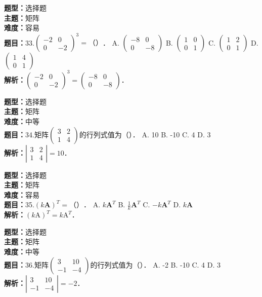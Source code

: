 \documentclass{ctexart}
\newenvironment{question}[5]{%
	\noindent\textbf{题型：}#1\\
	\textbf{主题：}#2\\
	\textbf{难度：}#3\\
	\textbf{题目：}#4\\
	\textbf{解析：}#5\\
	\vspace{1em}
}{}
\begin{document}
	\begin{question}
		{选择题}
		{矩阵}
		{容易}
		{33.\(\left(\begin{array}{cc}-2 & 0 \\ 0 & -2\end{array}\right)^3=（）\)．
			A. \(\left(\begin{array}{cc}-8 & 0 \\ 0 & -8\end{array}\right)\)
			B. \(\left(\begin{array}{ll}1 & 0 \\ 0 & 1\end{array}\right)\)
			C. \(\left(\begin{array}{ll}1 & 2 \\ 0 & 1\end{array}\right)\)
			D. \(\left(\begin{array}{ll}1 & 4 \\ 0 & 1\end{array}\right)\)}
		{\(\left(\begin{array}{cc}-2 & 0 \\ 0 & -2\end{array}\right)^3=\left(\begin{array}{cc}-8 & 0 \\ 0 & -8\end{array}\right)\)．}
	\end{question}
	
	\begin{question}
		{选择题}
		{矩阵}
		{中等}
		{34.矩阵\(\left(\begin{array}{ll}3 & 2 \\ 1 & 4\end{array}\right)\)的行列式值为（）．
			A. 10
			B. -10
			C. 4
			D. 3}
		{\(\left|\begin{array}{ll}3 & 2 \\ 1 & 4\end{array}\right|=10\)．}
	\end{question}
	
	\begin{question}
		{选择题}
		{矩阵}
		{容易}
		{35.\((k \mathbf{A})^T=（）\)．
			A. \(k \mathbf{A}^T\)
			B. \(\frac{1}{k} \mathbf{A}^T\)
			C. \(-k \mathbf{A}^T\)
			D. \(k \mathbf{A}\)}
		{\((k \mathrm{A})^T=k \mathrm{A}^T\)．}
	\end{question}
	
	\begin{question}
		{选择题}
		{矩阵}
		{中等}
		{36.矩阵\(\left(\begin{array}{cc}3 & 10 \\ -1 & -4\end{array}\right)\)的行列式值为（）．
			A. -2
			B. -10
			C. 4
			D. 3}
		{\(\left|\begin{array}{cc}3 & 10 \\ -1 & -4\end{array}\right|=-2\)．}
	\end{question}
	
\end{document}
